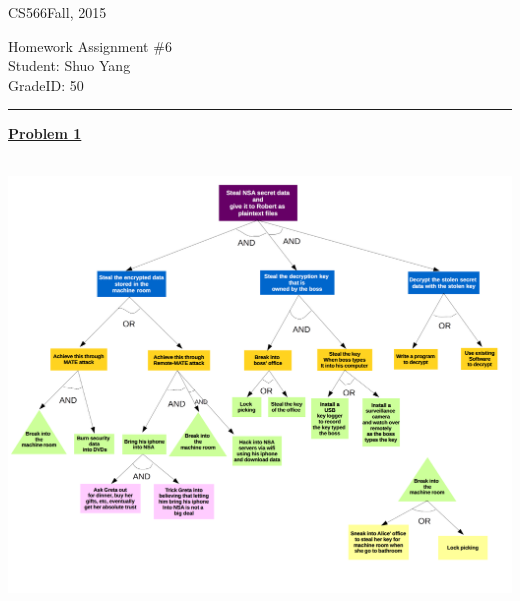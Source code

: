 \documentclass[11pt]{article}
\def\CourseCode{CS566}
\def\AssignmentNo{6}
\def\DateHandedOut{Fall, 2015}
\def\Author{Shuo Yang}
\def\GradeID{50}
\begin{document}
\noindent

\CourseCode \hfill \DateHandedOut

\begin{center}
Homework Assignment \#\AssignmentNo\\
Student: \Author\\
GradeID: \GradeID\\
\end{center}

\hrule\smallskip

\vspace{1.5em}
\underline{\textbf{Problem 1}}

\begin{center}
  \includegraphics[width=15cm,height=12cm]{./hw6-p1.png}
\end{center}
\end{document}
